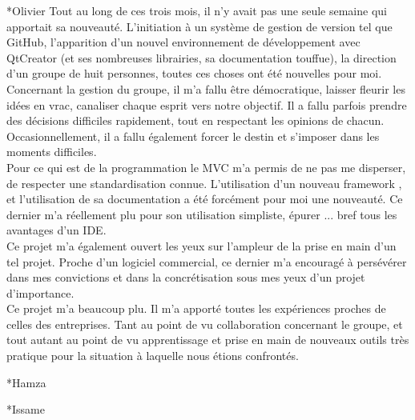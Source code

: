 \documentclass[a4paper, 12pt]{report}
\begin{document}
\begin{chapter}
		\begin{section}*{Olivier}
		Tout au long de ces trois mois, il n'y avait pas une seule semaine qui apportait sa nouveauté. L'initiation
à un système de gestion de version tel que GitHub, l’apparition d'un nouvel environnement de développement avec QtCreator (et ses nombreuses librairies, sa documentation touffue), la direction d'un groupe de huit personnes, toutes ces choses ont été nouvelles pour moi.\\
Concernant la gestion du groupe, il m'a fallu être démocratique, laisser fleurir les idées en vrac, canaliser chaque esprit vers notre objectif. Il a fallu parfois prendre des décisions difficiles rapidement, tout en respectant les opinions de chacun. Occasionnellement, il a fallu également forcer le destin et s'imposer dans les moments difficiles.\\
Pour ce qui est de la programmation le MVC m'a permis de ne pas me disperser, de respecter une standardisation connue. L'utilisation d'un nouveau framework , et l'utilisation de sa documentation a été forcément pour moi une nouveauté. Ce dernier m'a réellement plu pour son utilisation simpliste, épurer ... bref tous les avantages d'un IDE.\\
Ce projet m'a également ouvert les yeux sur l'ampleur de la prise en main d'un tel projet. Proche d'un logiciel commercial, ce dernier m'a encouragé à persévérer dans mes convictions et dans la concrétisation sous mes yeux d'un projet d'importance.\\ 
Ce projet m'a beaucoup plu. Il m'a apporté toutes les expériences proches de celles des entreprises. Tant au point de vu collaboration concernant le groupe, et tout autant au point de vu apprentissage et prise en main de nouveaux outils très pratique pour la situation à laquelle nous étions confrontés.\\
		\end{section}

		\begin{section}*{Hamza}
		\end{section}

		\begin{section}*{Issame}
		\end{section}


\end{chapter}
\end{document}
